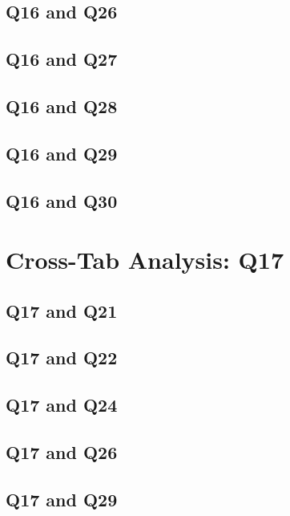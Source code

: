 \documentclass{report}
\begin{document}
\clearpage
\section{Q16 and Q26}


\clearpage
\section{Q16 and Q27}


\clearpage
\section{Q16 and Q28}


\clearpage
\section{Q16 and Q29}


\clearpage
\section{Q16 and Q30}


\chapter{Cross-Tab Analysis: Q17}
\section{Q17 and Q21}


\clearpage
\section{Q17 and Q22}


\clearpage
\section{Q17 and Q24}


\clearpage
\section{Q17 and Q26}


\clearpage
\section{Q17 and Q29}

\end{document}
